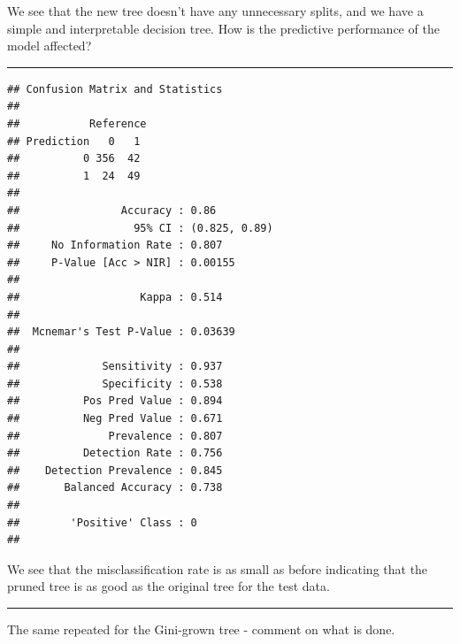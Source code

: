 \documentclass[]{article}
\newenvironment{Shaded}{\begin{snugshade}}{\end{snugshade}}
\newcommand{\DataTypeTok}[1]{\textcolor[rgb]{0.13,0.29,0.53}{#1}}
\newcommand{\KeywordTok}[1]{\textcolor[rgb]{0.13,0.29,0.53}{\textbf{#1}}}
\newcommand{\NormalTok}[1]{#1}
\newcommand{\OperatorTok}[1]{\textcolor[rgb]{0.81,0.36,0.00}{\textbf{#1}}}
\newcommand{\StringTok}[1]{\textcolor[rgb]{0.31,0.60,0.02}{#1}}
\begin{document}
We see that the new tree doesn't have any unnecessary splits, and we
have a simple and interpretable decision tree. How is the predictive
performance of the model affected?

\begin{center}\rule{0.5\linewidth}{\linethickness}\end{center}

\footnotesize

\begin{Shaded}
\end{Shaded}

\begin{verbatim}
## Confusion Matrix and Statistics
## 
##           Reference
## Prediction   0   1
##          0 356  42
##          1  24  49
##                                        
##                Accuracy : 0.86         
##                  95% CI : (0.825, 0.89)
##     No Information Rate : 0.807        
##     P-Value [Acc > NIR] : 0.00155      
##                                        
##                   Kappa : 0.514        
##                                        
##  Mcnemar's Test P-Value : 0.03639      
##                                        
##             Sensitivity : 0.937        
##             Specificity : 0.538        
##          Pos Pred Value : 0.894        
##          Neg Pred Value : 0.671        
##              Prevalence : 0.807        
##          Detection Rate : 0.756        
##    Detection Prevalence : 0.845        
##       Balanced Accuracy : 0.738        
##                                        
##        'Positive' Class : 0            
## 
\end{verbatim}

\normalsize

We see that the misclassification rate is as small as before indicating
that the pruned tree is as good as the original tree for the test data.

\begin{center}\rule{0.5\linewidth}{\linethickness}\end{center}

The same repeated for the Gini-grown tree - comment on what is done.
\end{document}
